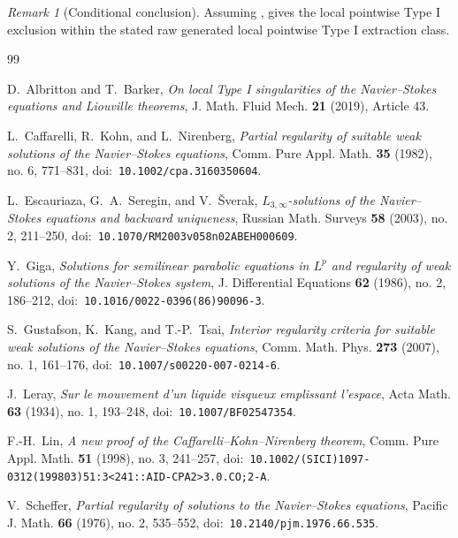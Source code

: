 \documentclass[11pt]{amsart}
\theoremstyle{plain}
\theoremstyle{definition}
\theoremstyle{remark}
\newtheorem{remark}[remark]{Remark}
\numberwithin{equation}{section}
\begin{document}
\begin{remark}[Conditional conclusion]
Assuming ,  gives the
local pointwise Type I exclusion within the stated raw generated local pointwise
Type I extraction class.
\end{remark}

\clearpage
\begin{thebibliography}{99}

D.~Albritton and T.~Barker,
\emph{On local Type I singularities of the Navier--Stokes equations and
Liouville theorems},
J. Math. Fluid Mech. \textbf{21} (2019), Article 43.

L.~Caffarelli, R.~Kohn, and L.~Nirenberg,
\emph{Partial regularity of suitable weak solutions of the Navier--Stokes
 equations},
Comm. Pure Appl. Math. \textbf{35} (1982), no. 6, 771--831,
doi:\ \nolinkurl{10.1002/cpa.3160350604}.

L.~Escauriaza, G.~A.~Seregin, and V.~{\v S}verak,
\emph{\(L_{3,\infty}\)-solutions of the Navier--Stokes equations and
 backward uniqueness},
Russian Math. Surveys \textbf{58} (2003), no. 2, 211--250,
doi:\ \nolinkurl{10.1070/RM2003v058n02ABEH000609}.

Y.~Giga,
\emph{Solutions for semilinear parabolic equations in \(L^p\) and regularity
 of weak solutions of the Navier--Stokes system},
J. Differential Equations \textbf{62} (1986), no. 2, 186--212,
doi:\ \nolinkurl{10.1016/0022-0396(86)90096-3}.

S.~Gustafson, K.~Kang, and T.-P.~Tsai,
\emph{Interior regularity criteria for suitable weak solutions of the
 Navier--Stokes equations},
Comm. Math. Phys. \textbf{273} (2007), no. 1, 161--176,
doi:\ \nolinkurl{10.1007/s00220-007-0214-6}.

J.~Leray,
\emph{Sur le mouvement d'un liquide visqueux emplissant l'espace},
Acta Math. \textbf{63} (1934), no. 1, 193--248,
doi:\ \nolinkurl{10.1007/BF02547354}.

F.-H.~Lin,
\emph{A new proof of the Caffarelli--Kohn--Nirenberg theorem},
Comm. Pure Appl. Math. \textbf{51} (1998), no. 3, 241--257,
doi:\ \nolinkurl{10.1002/(SICI)1097-0312(199803)51:3<241::AID-CPA2>3.0.CO;2-A}.

V.~Scheffer,
\emph{Partial regularity of solutions to the Navier--Stokes equations},
Pacific J. Math. \textbf{66} (1976), no. 2, 535--552,
doi:\ \nolinkurl{10.2140/pjm.1976.66.535}.


\end{thebibliography}
\end{document}
